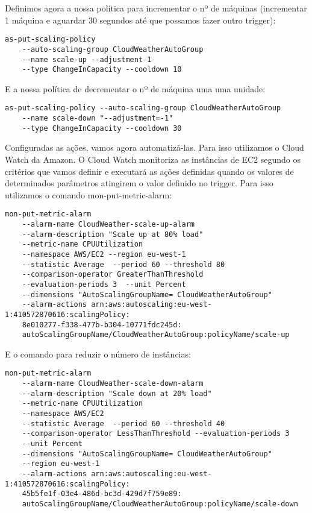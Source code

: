 Definimos agora a nossa política para incrementar o nº de máquinas (incrementar 1 máquina e aguardar 30 segundos até que possamos fazer outro trigger):\\

\lstset{language=Bash} 
\begin{lstlisting}
as-put-scaling-policy 
	--auto-scaling-group CloudWeatherAutoGroup 
	--name scale-up --adjustment 1 
	--type ChangeInCapacity --cooldown 10
\end{lstlisting}
 E a nossa política de decrementar o nº de máquina uma uma unidade:

\lstset{language=Bash} 
\begin{lstlisting}
as-put-scaling-policy --auto-scaling-group CloudWeatherAutoGroup 
	--name scale-down "--adjustment=-1" 
	--type ChangeInCapacity --cooldown 30
\end{lstlisting}


Configuradas as ações, vamos agora automatizá-las. Para isso utilizamos o Cloud Watch da Amazon. O Cloud Watch monitoriza as instâncias de EC2 segundo os critérios que vamos definir e executará as ações definidas quando os valores de determinados parâmetros atingirem o valor definido no trigger.  Para isso utilizamos o comando mon-put-metric-alarm:\\

\lstset{language=Bash} 
\begin{lstlisting}
mon-put-metric-alarm 
	--alarm-name CloudWeather-scale-up-alarm
	--alarm-description "Scale up at 80% load"
	--metric-name CPUUtilization
	--namespace AWS/EC2 --region eu-west-1 
	--statistic Average  --period 60 --threshold 80 
	--comparison-operator GreaterThanThreshold 
	--evaluation-periods 3  --unit Percent
	--dimensions "AutoScalingGroupName= CloudWeatherAutoGroup"
	--alarm-actions arn:aws:autoscaling:eu-west-1:410572870616:scalingPolicy:
	8e010277-f338-477b-b304-10771fdc245d:
	autoScalingGroupName/CloudWeatherAutoGroup:policyName/scale-up
\end{lstlisting}

E o comando para reduzir o número de instâncias: 

\lstset{language=Bash} 
\begin{lstlisting}
mon-put-metric-alarm 
	--alarm-name CloudWeather-scale-down-alarm
	--alarm-description "Scale down at 20% load" 
	--metric-name CPUUtilization 
	--namespace AWS/EC2 
	--statistic Average  --period 60 --threshold 40 
	--comparison-operator LessThanThreshold --evaluation-periods 3  
	--unit Percent 
	--dimensions "AutoScalingGroupName= CloudWeatherAutoGroup" 
	--region eu-west-1 
	--alarm-actions arn:aws:autoscaling:eu-west-1:410572870616:scalingPolicy:
	45b5fe1f-03e4-486d-bc3d-429d7f759e89:
	autoScalingGroupName/CloudWeatherAutoGroup:policyName/scale-down
\end{lstlisting}


